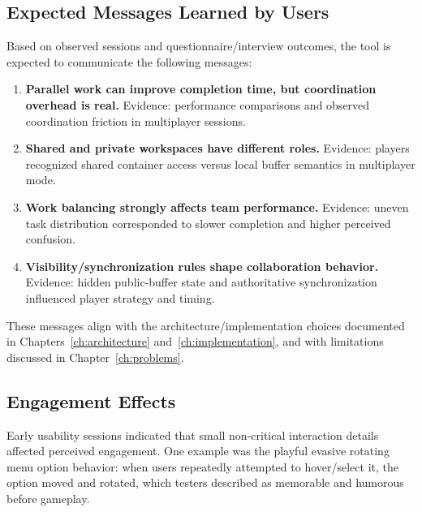 \subsection{Expected Messages Learned by Users}
\label{subsec:learner-messages}

Based on observed sessions and questionnaire/interview outcomes, the tool is expected to communicate the following messages:

\begin{enumerate}
    \item \textbf{Parallel work can improve completion time, but coordination overhead is real.}
          Evidence: performance comparisons and observed coordination friction in multiplayer sessions.

    \item \textbf{Shared and private workspaces have different roles.}
          Evidence: players recognized shared container access versus local buffer semantics in multiplayer mode.

    \item \textbf{Work balancing strongly affects team performance.}
          Evidence: uneven task distribution corresponded to slower completion and higher perceived confusion.

    \item \textbf{Visibility/synchronization rules shape collaboration behavior.}
          Evidence: hidden public-buffer state and authoritative synchronization influenced player strategy and timing.
\end{enumerate}

These messages align with the architecture/implementation choices documented in Chapters~\ref{ch:architecture} and~\ref{ch:implementation}, and with limitations discussed in Chapter~\ref{ch:problems}.

\subsection{Engagement Effects}
\label{subsec:engagement-effects}

Early usability sessions indicated that small non-critical interaction details affected perceived engagement. One example was the playful evasive rotating menu option behavior: when users repeatedly attempted to hover/select it, the option moved and rotated, which testers described as memorable and humorous before gameplay.

